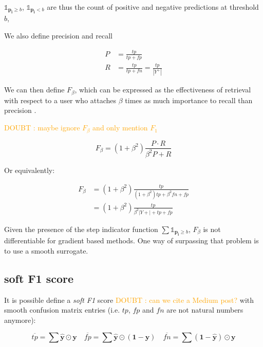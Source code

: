 \documentclass[sigconf,natbib,screen=true,review=true,anonymous]{acmart}
\newcommand\doubt[1]{\textcolor{orange}{DOUBT : #1}}
\begin{document}
\(\mathds{1}_{\mathbf{p_i} \geq b}\), \(\mathds{1}_{\mathbf{p_i} < b}\) are thus the count of positive and negative predictions at threshold \(b\), 

We also define precision and recall

\begin{equation}
\begin{aligned} P &=\frac{t p}{t p+f p} \\ R &=\frac{t p}{t p+f n}=\frac{t p}{\left|Y^{+}\right|} \end{aligned}
\end{equation}

We can then define \(F_\beta\), which can be expressed as the effectiveness of retrieval with respect to a user who attaches \(\beta\) times as much importance to recall than precision \cite{informationRetrieval}.

\doubt{maybe ignore $F_\beta$ and only mention $F_1$}

\begin{equation}
F_{\beta}=\left(1+\beta^{2}\right) \frac{P \cdot R}{\beta^{2} P+R}
\end{equation}

Or equivalently:

\begin{equation}
\begin{aligned} F_{\beta} &=\left(1+\beta^{2}\right) \frac{t p}{\left(1+\beta^{2}\right) t p+\beta^{2} f n+f p} \\ &=\left(1+\beta^{2}\right) \frac{t p}{\beta^{2}|Y+|+t p+f p} \end{aligned}
\end{equation}

Given the presence of the step indicator function \(\sum \mathds{1}_{\mathbf{p_i} \geq b}\), \(F_\beta\) is not differentiable for gradient based methods. One way of surpassing that problem is to use a smooth surrogate.

\subsection{soft F1 score}
\label{sec:org0e61940}

It is possible define a \emph{soft F1} score \cite{softF1} \doubt{can we cite a Medium post?} with smooth confusion matrix entries (i.e. \(tp\), \(fp\) and \(fn\) are not natural numbers anymore):

$$
\overline{tp}=\sum \hat{\mathbf{y}} \odot \mathbf{y} \quad \overline{fp} = \sum \hat{\mathbf{y}} \odot (\mathbf{1}- \mathbf{y}) \quad \overline{fn} = \sum (\mathbf{1} - \hat{\mathbf{y}}) \odot \mathbf{y}
$$
\end{document}
